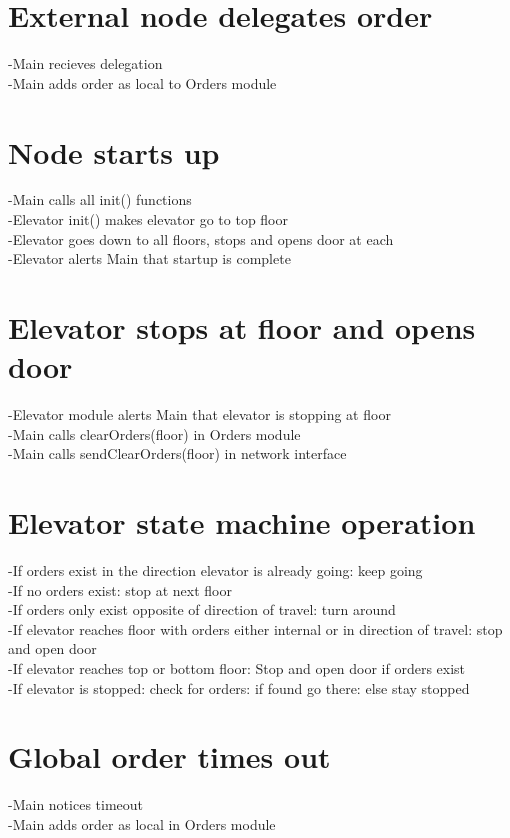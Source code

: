 \documentclass{article}
\begin{document}
\section{External node delegates order}
-Main recieves delegation\\
-Main adds order as local to Orders module\\

\section{Node starts up}
-Main calls all init() functions\\
-Elevator init() makes elevator go to top floor\\
-Elevator goes down to all floors, stops and opens door at each\\
-Elevator alerts Main that startup is complete\\

\section{Elevator stops at floor and opens door}
-Elevator module alerts Main that elevator is stopping at floor\\
-Main calls clearOrders(floor) in Orders module\\
-Main calls sendClearOrders(floor) in network interface\\

\section{Elevator state machine operation}
-If orders exist in the direction elevator is already going: keep going\\
-If no orders exist: stop at next floor\\
-If orders only exist opposite of direction of travel: turn around\\
-If elevator reaches floor with orders either internal or in direction of travel: stop and open door\\
-If elevator reaches top or bottom floor: Stop and open door if orders exist\\
-If elevator is stopped: check for orders: if found go there: else stay stopped\\

\section{Global order times out}
-Main notices timeout\\
-Main adds order as local in Orders module\\
\end{document}
